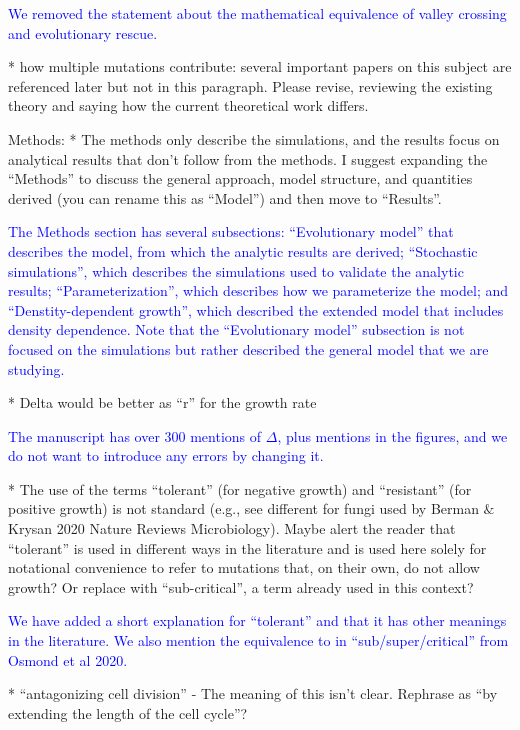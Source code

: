 \documentclass[12pt]{extarticle}
\begin{document}
\textcolor{blue}{We removed the statement about the mathematical equivalence of valley crossing and evolutionary rescue.}

* how multiple mutations contribute: several important papers on this subject are referenced later but not in this paragraph. Please revise, reviewing the existing theory and saying how the current theoretical work differs.

Methods:
* The methods only describe the simulations, and the results focus on analytical results that don't follow from the methods. I suggest expanding the ``Methods'' to discuss the general approach, model structure, and quantities derived (you can rename this as ``Model'') and then move to ``Results''.

\textcolor{blue}{
The Methods section has several subsections: ``Evolutionary model'' that describes the model, from which the analytic results are derived; ``Stochastic simulations'', which describes the simulations used to validate the analytic results; ``Parameterization'', which describes how we parameterize the model; and ``Denstity-dependent growth'', which described the extended model that includes density dependence. Note that the ``Evolutionary model'' subsection is not focused on the simulations but rather described the general model that we are studying.} 

* Delta would be better as ``r'' for the growth rate

\textcolor{blue}{The manuscript has over 300 mentions of $\Delta$, plus mentions in the figures, and we do not want to introduce any errors by changing it.}

* The use of the terms ``tolerant'' (for negative growth) and ``resistant'' (for positive growth) is not standard (e.g., see different for fungi used by Berman $\&$ Krysan 2020 Nature Reviews Microbiology). Maybe alert the reader that ``tolerant'' is used in different ways in the literature and is used here solely for notational convenience to refer to mutations that, on their own, do not allow growth? Or replace with ``sub-critical'', a term already used in this context?

\textcolor{blue}{We have added a short explanation for ``tolerant'' and that it has other meanings in the literature. We also mention the equivalence to in ``sub/super/critical'' from Osmond et al 2020.} %

* ``antagonizing cell division'' - The meaning of this isn't clear. Rephrase as ``by extending the length of the cell cycle''?
\end{document}
